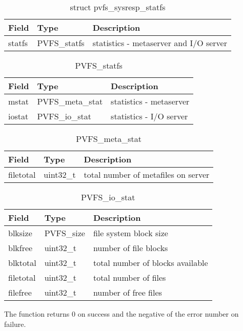 \documentclass[11pt, letterpaper]{article}
\begin{document}
\begin{table}[H]
\begin{tabular}{|l|l|l|}
\hline
Field & Type & Description \\
\hline
\hline
statfs & PVFS\_statfs & statistics - metaserver and I/O server\\
\hline
\end{tabular}
\caption{struct pvfs\_sysresp\_statfs}\label{tab:respstatfs}
\end{table}

\begin{table}[H]
\begin{tabular}{|l|l|l|}
\hline
Field & Type & Description \\
\hline
\hline
mstat & PVFS\_meta\_stat & statistics - metaserver \\
\hline
iostat & PVFS\_io\_stat & statistics - I/O server \\
\hline
\end{tabular}
\caption{PVFS\_statfs}\label{tab:statfs}
\end{table}

\begin{table}[H]
\begin{tabular}{|l|l|l|}
\hline
Field & Type & Description \\
\hline
\hline
filetotal & uint32\_t & total number of metafiles on server \\
\hline
\end{tabular}
\caption{PVFS\_meta\_stat}\label{tab:metastat}
\end{table}

\begin{table}[H]
\begin{tabular}{|l|l|l|}
\hline
Field & Type & Description \\
\hline
\hline
blksize & PVFS\_size & file system block size \\
\hline
blkfree & uint32\_t & number of file blocks \\
\hline
blktotal & uint32\_t & total number of blocks available \\
\hline 
filetotal & uint32\_t & total number of files \\
\hline 
filefree & uint32\_t & number of free files \\
\hline
\end{tabular}
\caption{PVFS\_io\_stat}\label{tab:iostat}
\end{table}

The function returns 0 on success and the negative of the error
number on failure.
\end{document}
